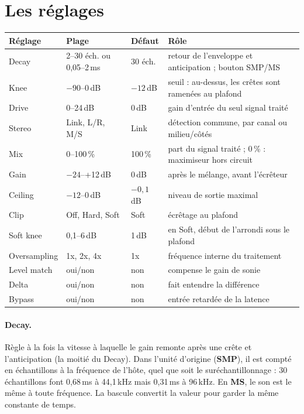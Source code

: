 \documentclass[a4paper,11pt]{article}
\newcommand{\ctl}[1]{\textsf{\textbf{#1}}}   %
\newcommand{\dB}{\,dB}
\begin{document}
\section{Les réglages}

\begin{center}
\small
\begin{tabularx}{\textwidth}{@{}l l l X@{}}
\toprule
Réglage & Plage & Défaut & Rôle \\
\midrule
Decay & 2--30 éch. ou 0,05--2\,ms & 30 éch. & retour de l'enveloppe et anticipation ; bouton SMP/MS \\
Knee & $-90$--0\dB & $-12$\dB & seuil : au-dessus, les crêtes sont ramenées au plafond \\
Drive & 0--24\dB & 0\dB & gain d'entrée du seul signal traité \\
Stereo & Link, L/R, M/S & Link & détection commune, par canal ou milieu/côtés \\
Mix & 0--100\,\% & 100\,\% & part du signal traité ; 0\,\% : maximiseur hors circuit \\
Gain & $-24$--+12\dB & 0\dB & après le mélange, avant l'écrêteur \\
Ceiling & $-12$--0\dB & $-0{,}1$\dB & niveau de sortie maximal \\
Clip & Off, Hard, Soft & Soft & écrêtage au plafond \\
Soft knee & 0,1--6\dB & 1\dB & en Soft, début de l'arrondi sous le plafond \\
Oversampling & 1x, 2x, 4x & 1x & fréquence interne du traitement \\
Level match & oui/non & non & compense le gain de sonie \\
Delta & oui/non & non & fait entendre la différence \\
Bypass & oui/non & non & entrée retardée de la latence \\
\bottomrule
\end{tabularx}
\end{center}

\paragraph{Decay.} Règle à la fois la vitesse à laquelle le gain remonte après une crête et
l'anticipation (la moitié du Decay). Dans l'unité d'origine (\ctl{SMP}), il est compté en
échantillons à la fréquence de l'hôte, quel que soit le suréchantillonnage : 30 échantillons
font 0,68\,ms à 44,1\,kHz mais 0,31\,ms à 96\,kHz. En \ctl{MS}, le son est le même à toute
fréquence. La bascule convertit la valeur pour garder la même constante de temps.
\end{document}
